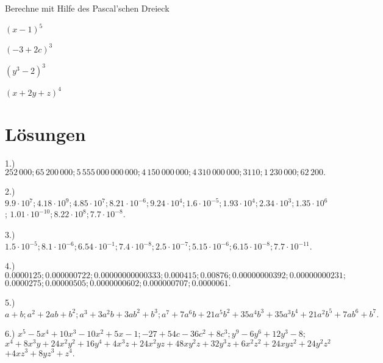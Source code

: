 \documentclass[
twoside,%
ngerman,%
headsepline%
11pt]%
{article}
\begin{document}
\begin{ueb}
Berechne mit Hilfe des Pascal'schen Dreieck

\begin{minipage}{0.23\textwidth}
\begin{enumeratea}
\item $(x-1)^5$
\item $(-3+2c)^3$
\end{enumeratea}
\end{minipage}
\begin{minipage}{0.23\textwidth}
\begin{enumeratea}
\addtocounter{enumi}{2}
\item $(y^3-2)^3$
\item $(x+2y+z)^4$
\end{enumeratea}
\end{minipage}
\end{ueb}

\pagebreak

\section*{L\"osungen}

\hspace*{2.7ex} 1.) $252\,000; 65\,200\,000; 5\,555\,000\,000\,000;4\,150\,000\,000;4\,310\,000\,000;3110;1\,230\,000;62\,200.$

2.) $9.9\cdot10^{7};4.18\cdot10^{9};4.85\cdot10^{7}; 8.21\cdot10^{-6}; 9.24\cdot10^{4}; 1.6\cdot10^{-5}; 1.93\cdot10^{4}; 2.34\cdot10^{3}; 1.35\cdot10^{6}$;
\hspace*{7ex}$1.01\cdot10^{-10}; 8.22\cdot10^{8}; 7.7\cdot10^{-8}.$

3.) $1.5\cdot10^{-5};8.1\cdot10^{-6}; 6.54\cdot10^{-1}; 7.4\cdot10^{-8}; 2.5\cdot10^{-7}; 5.15\cdot10^{-6}; 6.15\cdot10^{-8}; 7.7\cdot10^{-11}.$

4.) $0.0000125; 0.000000722; 0.00000000000333; 0.000415; 0.00876; 0.00000000392; 0.00000000231;$
\hspace*{7ex}$0.0000275; 0.00000505; 0.0000000602; 0.000000707; 0.0000061.$

5.) $a+b; a^2+2ab+b^2; a^3+3a^2b+3ab^2+b^3; a^7+7a^6b+21a^5b^2+35a^4b^3+35a^3b^4+21a^2b^5+7ab^6+b^7.$

6.) $x^5-5x^4+10x^3-10x^2+5x-1; -27+54c-36c^2+8c^3; y^9-6y^6+12y^3-8;$\\
\hspace*{7ex}$x^4+8x^3y+24x^2y^2+16y^4+4x^3z+24x^2yz+48xy^2z+32y^3z+6x^2z^2+24xyz^2+24y^2z^2$
\hspace*{7ex}$+4xz^3+8yz^3+z^4.$
\end{document}
